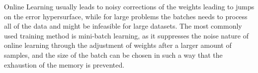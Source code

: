 Online Learning usually leads to noisy corrections of the weights leading to jumps on the error hypersurface, while for large problems the batches needs to process all of the data and might be infeasible for large datasets. The most commonly used training method is mini-batch learning, as it suppresses the noise nature of online learning through the adjustment of weights after a larger amount of samples, and the size of the batch can be chosen in such a way that the exhaustion of the memory is prevented. 





